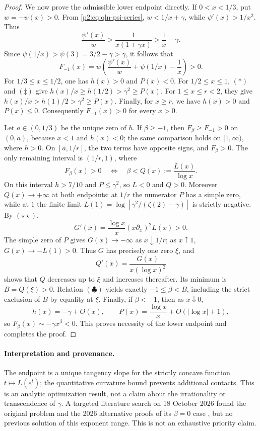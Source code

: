 \documentclass[11pt,a4paper]{article}
\theoremstyle{definition}
\theoremstyle{remark}
\numberwithin{equation}{section}
\begin{document}
\begin{proof}
We now prove the admissible lower endpoint directly.  If $0<x<1/3$, put
$w=-\psi(x)>0$.  From \eqref{p2:eq:qln-psi-series},
$w<1/x+\gamma$, while $\psi'(x)>1/x^2$.  Thus
\[
 \frac{\psi'(x)}w>\frac1{x(1+\gamma x)}>\frac1x-\gamma.
\]
Since $\psi(1/x)>\psi(3)=3/2-\gamma>\gamma$, it follows that
\[
 F_{-1}(x)=w\left(\frac{\psi'(x)}w+\psi(1/x)-\frac1x\right)>0.
\]
For $1/3\le x\le1/2$, one has $h(x)>0$ and $P(x)<0$.
For $1/2\le x\le1$, \((*)\) and \((\ddagger)\) give
$h(x)/x\ge h(1/2)>\gamma^2\ge P(x)$.
For $1\le x\le r<2$, they give
$h(x)/x>h(1)/2>\gamma^2\ge P(x)$.
Finally, for $x\ge r$, we have $h(x)>0$ and $P(x)\le0$.
Consequently $F_{-1}(x)>0$ for every $x>0$.

Let $a\in(0,1/3)$ be the unique zero of $h$.  If $\beta\ge-1$, then
$F_\beta\ge F_{-1}>0$ on $(0,a)$, because $x<1$ and $h(x)<0$;
the same comparison holds on $[1,\infty)$, where $h>0$.
On $[a,1/r]$, the two terms have opposite signs, and $F_\beta>0$.
The only remaining interval is $(1/r,1)$, where
\[
 F_\beta(x)>0\quad\Longleftrightarrow\quad
 \beta<Q(x):=\frac{L(x)}{\log x}.             \tag{\(\clubsuit\)}
\]
On this interval $h>7/10$ and $P\le\gamma^2$, so $L<0$ and $Q>0$.
Moreover $Q(x)\to+\infty$ at both endpoints: at $1/r$ the numerator
$P$ has a simple zero, while at $1$ the finite limit
$L(1)=\log[\gamma^2/(\zeta(2)-\gamma)]$ is strictly negative.
By \((\star\star)\),
\[
 G'(x)=\frac{\log x}{x}(x\partial_x)^2L(x)>0.
\]
The simple zero of $P$ gives $G(x)\to-\infty$ as $x\downarrow1/r$;
as $x\uparrow1$, $G(x)\to-L(1)>0$.
Thus $G$ has precisely one zero $\xi$, and
\[
 Q'(x)=\frac{G(x)}{x(\log x)^2}
\]
shows that $Q$ decreases up to $\xi$ and increases thereafter.
Its minimum is $B=Q(\xi)>0$.  Relation \((\clubsuit)\) yields exactly
$-1\le\beta<B$, including the strict exclusion of $B$ by equality at $\xi$.
Finally, if $\beta<-1$, then as $x\downarrow0$,
\[
 h(x)=-\gamma+O(x),\qquad
 P(x)=\frac{\log x}{x}+O(|\log x|+1),
\]
so $F_\beta(x)\sim-\gamma x^\beta<0$.
This proves necessity of the lower endpoint and completes the proof.
\end{proof}

\paragraph{Interpretation and provenance.}
The endpoint is a unique tangency slope for the strictly concave function
$t\mapsto L(e^t)$; the quantitative curvature bound prevents additional
contacts.  This is an analytic optimization result, not a claim about the
irrationality or transcendence of $\gamma$.
A targeted literature search on 18 October 2026 found the original problem
and the 2026 alternative proofs of its $\beta=0$ case \cite{p2:shuang2026}, but
no previous solution of this exponent range.  This is not an exhaustive
priority claim.
\end{document}
